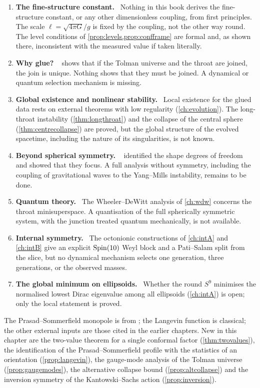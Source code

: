 \begin{enumerate}[label=\arabic*.]
\item \textbf{The fine-structure constant.} \opn\ Nothing in this book derives the fine-structure constant, or any other dimensionless coupling, from first principles. The scale $\ell=\sqrt{4\pi G}/g$ is fixed by the coupling, not the other way round. The level conditions of \cref{prop:levels,prop:confframe} are formal and, as shown there, inconsistent with the measured value if taken literally.
\item \textbf{Why glue?} \opn\  shows that if the Tolman universe and the throat are joined, the join is unique. Nothing shows that they must be joined. A dynamical or quantum selection mechanism is missing.
\item \textbf{Global existence and nonlinear stability.} \opn\ Local existence for the glued data rests on external theorems with low regularity (\cref{ch:evolution}). The long-throat instability (\cref{thm:longthroat}) and the collapse of the central sphere (\cref{thm:centrecollapse}) are proved, but the global structure of the evolved spacetime, including the nature of its singularities, is not known.
\item \textbf{Beyond spherical symmetry.} \opn\  identified the shape degrees of freedom and showed that they focus. A full analysis without symmetry, including the coupling of gravitational waves to the Yang--Mills instability, remains to be done.
\item \textbf{Quantum theory.} \opn\ The Wheeler--DeWitt analysis of \cref{ch:wdw} concerns the throat minisuperspace. A quantisation of the full spherically symmetric system, with the junction treated quantum mechanically, is not available.
\item \textbf{Internal symmetry.} \opn\ The octonionic constructions of \cref{ch:intA} and \cref{ch:intB} give an explicit $\mathrm{Spin}(10)$ Weyl block and a Pati--Salam split from the slice, but no dynamical mechanism selects one generation, three generations, or the observed masses.
\item \textbf{The global minimum on ellipsoids.} \opn\ Whether the round $S^9$ minimises the normalised lowest Dirac eigenvalue among all ellipsoids (\cref{ch:intA}) is open; only the local statement is proved.
\end{enumerate}

\begin{litbox}
The Prasad--Sommerfield monopole is from \cite{PrasadSommerfield1975}; the Langevin function is classical; the other external inputs are those cited in the earlier chapters. New in this chapter are the two-value theorem for a single conformal factor (\cref{thm:twovalues}), the identification of the Prasad--Sommerfield profile with the statistics of an orientation (\cref{prop:langevin}), the gauge-mode analysis of the Tolman universe (\cref{prop:gaugemodes}), the alternative collapse bound (\cref{prop:altcollapse}) and the inversion symmetry of the Kantowski--Sachs action (\cref{prop:inversion}).
\end{litbox}

